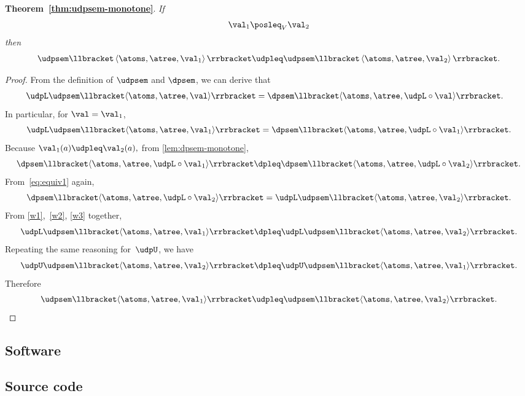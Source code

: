 \textbf{Theorem~\ref{thm:udpsem-monotone}}. \emph{If
\[
\val_{1}\posleq_{V}\val_{2}
\]
then
\[
\udpsem\llbracket\left\langle \atoms,\atree,\val_{1}\right\rangle \rrbracket\udpleq\udpsem\llbracket\left\langle \atoms,\atree,\val_{2}\right\rangle \rrbracket.
\]
}
\begin{proof}
From the definition of $\udpsem$ and $\dpsem$, we can derive that
\begin{align}
\udpL\udpsem\llbracket\langle\atoms,\atree,\val\rangle\rrbracket & =\dpsem\llbracket\langle\atoms,\atree,\udpL\circ\val\rangle\rrbracket.\label{eq:equiv1}
\end{align}
In particular, for $\val=\val_{1}$,
\begin{equation}
\udpL\udpsem\llbracket\langle\atoms,\atree,\val_{1}\rangle\rrbracket=\dpsem\llbracket\langle\atoms,\atree,\udpL\circ\val_{1}\rangle\rrbracket.\label{eq:w1}
\end{equation}
Because $\val_{1}(a)\udpleq\val_{2}(a),$ from \cref{lem:dpsem-monotone},
\begin{equation}
\dpsem\llbracket\langle\atoms,\atree,\udpL\circ\val_{1}\rangle\rrbracket\dpleq\dpsem\llbracket\langle\atoms,\atree,\udpL\circ\val_{2}\rangle\rrbracket.\label{eq:w2}
\end{equation}
From~\cref{eq:equiv1} again,
\begin{equation}
\dpsem\llbracket\langle\atoms,\atree,\udpL\circ\val_{2}\rangle\rrbracket=\udpL\udpsem\llbracket\langle\atoms,\atree,\val_{2}\rangle\rrbracket.\label{eq:w3}
\end{equation}
From \eqref{w1},~\eqref{w2}, \eqref{w3} together,
\[
\udpL\udpsem\llbracket\langle\atoms,\atree,\val_{1}\rangle\rrbracket\dpleq\udpL\udpsem\llbracket\langle\atoms,\atree,\val_{2}\rangle\rrbracket.
\]
 Repeating the same reasoning for~$\udpU$, we have
\[
\udpU\udpsem\llbracket\langle\atoms,\atree,\val_{2}\rangle\rrbracket\dpleq\udpU\udpsem\llbracket\langle\atoms,\atree,\val_{1}\rangle\rrbracket.
\]
 Therefore
\[
\udpsem\llbracket\langle\atoms,\atree,\val_{1}\rangle\rrbracket\udpleq\udpsem\llbracket\langle\atoms,\atree,\val_{2}\rangle\rrbracket.
\]
\end{proof}

\vfill\pagebreak

\subsection{Software}

\subsection{Source code}

